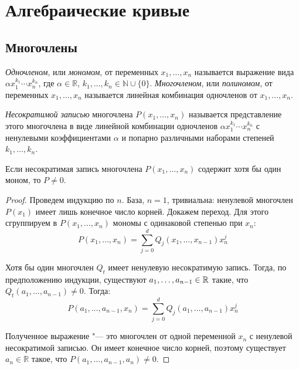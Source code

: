 \section{Алгебраические кривые}

\subsection{Многочлены}

\begin{definition}
	\textit{Одночленом}, или \textit{мономом}, от переменных $x_1, \dotsc, x_n$ называется выражение вида $\alpha x_1^{k_1} \dotsm x_n^{k_n}$, где $\alpha \in \mathbb{R}$, $k_1, \dotsc, k_n \in \mathbb{N} \cup \{0\}$. \textit{Многочленом}, или \textit{полиномом}, от переменных $x_1, \dotsc, x_n$ называется линейная комбинация одночленов от $x_1, \dotsc, x_n$.
\end{definition}

\begin{definition}
	\textit{Несократимой записью} многочлена $P(x_1, \dotsc, x_n)$ называется представление этого многочлена в виде линейной комбинации одночленов $\alpha x_1^{k_1} \dotsm x_n^{k_n}$ с ненулевыми коэффициентами $\alpha$ и попарно различными наборами степеней $k_1, \dotsc, k_n$.
\end{definition}

\begin{proposition}
	Если несократимая запись многочлена $P(x_1, \dots, x_n)$ содержит хотя бы один моном, то $P \ne 0$.
\end{proposition}

\begin{proof}
	Проведем индукцию по $n$. База, $n = 1$, тривиальна: ненулевой многочлен $P(x_1)$ имеет лишь конечное число корней. Докажем переход. Для этого сгруппируем в $P(x_1, \dots, x_n)$ мономы с одинаковой степенью при $x_n$:
	\[P(x_1, \dots, x_n) = \sum_{j = 0}^dQ_j(x_1,\dots, x_{n-1})x_n^j\]
	
	Хотя бы один многочлен $Q_t$ имеет ненулевую несократимую запись. Тогда, по предположению индукции, существуют $a_1,\dots,a_{n-1} \in \mathbb{R}$ такие, что $Q_t(a_1, \dots, a_{n-1}) \ne 0$. Тогда:
	\[P(a_1, \dots, a_{n-1}, x_n) = \sum_{j = 0}^dQ_j(a_1,\dots,a_{n-1})x_n^j\]
	
	Полученное выражение "--- это многочлен от одной переменной $x_n$ с ненулевой несократимой записью. Он имеет конечное число корней, поэтому существует $a_n \in \mathbb{R}$ такое, что $P(a_1, \dots, a_{n-1}, a_n) \ne 0$.
\end{proof}

